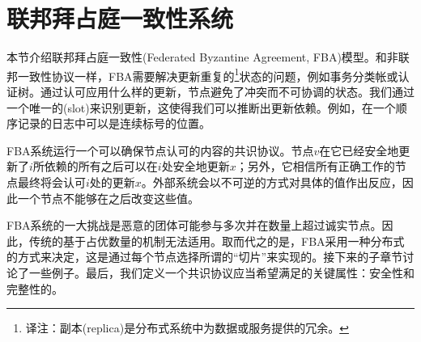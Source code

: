 \section{联邦拜占庭一致性系统}\label{sec:fba}

本节介绍联邦拜占庭一致性(Federated Byzantine Agreement, FBA)模型。和非联邦一致性协议一样，FBA需要解决更新重复的\footnote{译注：副本(replica)是分布式系统中为数据或服务提供的冗余。}状态的问题，例如事务分类帐或认证树。通过认可应用什么样的更新，节点避免了冲突而不可协调的状态。我们通过一个唯一的{\slot}(slot)来识别更新，这使得我们可以推断出更新依赖。例如，在一个顺序记录的日志中{\slot}可以是连续标号的位置。

FBA系统运行一个可以确保节点认可{\slot}的内容的共识协议。节点$v$在它已经安全地更新了{\slot}$i$所依赖的所有{\slot}之后可以在{\slot}$i$处安全地更新$x$；另外，它相信所有正确工作的节点最终将会认可{\slot}$i$处的更新$x$。外部系统会以不可逆的方式对具体的值作出反应，因此一个节点不能够在之后改变这些值。

FBA系统的一大挑战是恶意的团体可能参与多次并在数量上超过诚实节点。因此，传统的基于占优数量的{\quorum}机制无法适用。取而代之的是，FBA采用一种分布式的方式来决定{\quorum}，这是通过每个节点选择所谓的``{\quorum}切片''来实现的。接下来的子章节讨论了一些例子。最后，我们定义一个共识协议应当希望满足的关键属性：安全性和完整性的。



